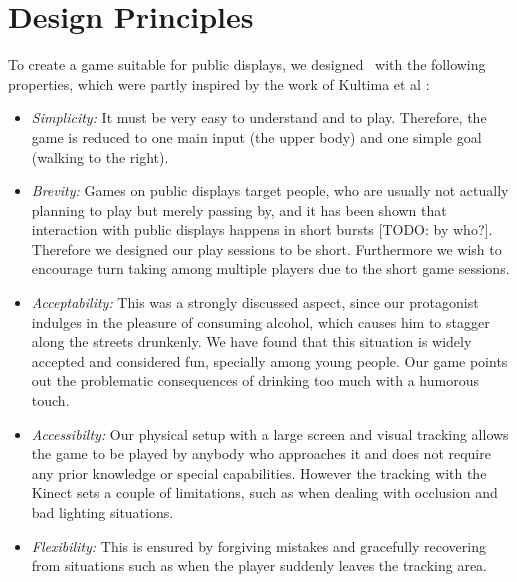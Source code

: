 \documentclass{chi-ext}
\begin{document}
%

\section{Design Principles}
%
To create a game suitable for public displays, we designed \drunkened\ with the following properties, which were partly inspired by the work of Kultima et al \cite{kultima2009casual}:
\begin{itemize}\compresslist
\item \textit{Simplicity:} It must be very easy to understand and to play. Therefore, the game is reduced to one main input (the upper body) and one simple goal (walking to the right).
\item \textit{Brevity:} Games on public displays target people, who are usually not actually planning to play but merely passing by, and it has been shown that interaction with public displays happens in short bursts [TODO: by who?]. Therefore we designed our play sessions to be short. Furthermore we wish to encourage turn taking among multiple players due to the short game sessions.
\item \textit{Acceptability:} This was a strongly discussed aspect, since our protagonist indulges in the pleasure of consuming alcohol, which causes him to stagger along the streets drunkenly. We have found that this situation is widely accepted and considered fun, specially among young people. Our game points out the problematic consequences of drinking too much with a humorous touch.
\item \textit{Accessibilty:} Our physical setup with a large screen and visual tracking allows the game to be played by anybody who approaches it and does not require any prior knowledge or special capabilities. However the tracking with the Kinect sets a couple of limitations, such as when dealing with occlusion and bad lighting situations.
\item \textit{Flexibility:} This is ensured by forgiving mistakes and gracefully recovering from situations such as when the player suddenly leaves the tracking area.
\end{itemize}

\end{document}
